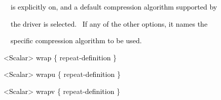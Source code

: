 \documentclass[a4paper]{article}
\newcommand\textstyleOOoComputerKeyWord[1]{\textrm{\textcolor[rgb]{0.0,0.0,0.5019608}{#1}}}
\newcommand\textstyleOOoAssemblerSpecialChar[1]{\textrm{\textcolor[rgb]{0.0,0.5019608,0.0}{#1}}}
\newcommand\textstyleOOoAssemblerIdent[1]{\textrm{\textcolor{black}{#1}}}
\newcommand\textstyleOOoAssemblerDirective[1]{\textrm{\textcolor[rgb]{0.0,0.5019608,1.0}{#1}}}
\begin{document}
{\color{black}
\textstyleOOoComputerKeyWord{\textcolor{black}{\ \ \ \ is explicitly on, and a default compression algorithm supported
by}}}

\clearpage
\bigskip

{\color{black}
\textstyleOOoComputerKeyWord{\textcolor{black}{\ \ \ \ the driver is selected. \ If any of the other options, it names
the}}}

{\color{black}
\textstyleOOoComputerKeyWord{\textcolor{black}{\ \ \ \ specific compression algorithm to be used.}}}


\bigskip

{\color{black}
\textstyleOOoComputerKeyWord{\textcolor{black}{\ \ }}\textstyleOOoAssemblerSpecialChar{{\textless}}\textstyleOOoAssemblerIdent{Scalar}\textstyleOOoAssemblerSpecialChar{{\textgreater}}\textstyleOOoComputerKeyWord{\textcolor{black}{
}}\textstyleOOoAssemblerIdent{wrap}\textstyleOOoComputerKeyWord{\textcolor{black}{
}}\textstyleOOoAssemblerSpecialChar{\{}\textstyleOOoComputerKeyWord{\textcolor{black}{
}}\textstyleOOoAssemblerDirective{repeat}\textstyleOOoAssemblerSpecialChar{{}-}\textstyleOOoAssemblerIdent{definition}\textstyleOOoComputerKeyWord{\textcolor{black}{
}}\textstyleOOoAssemblerSpecialChar{\}}}

{\color{black}
\textstyleOOoComputerKeyWord{\textcolor{black}{\ \ }}\textstyleOOoAssemblerSpecialChar{{\textless}}\textstyleOOoAssemblerIdent{Scalar}\textstyleOOoAssemblerSpecialChar{{\textgreater}}\textstyleOOoComputerKeyWord{\textcolor{black}{
}}\textstyleOOoAssemblerIdent{wrapu}\textstyleOOoComputerKeyWord{\textcolor{black}{
}}\textstyleOOoAssemblerSpecialChar{\{}\textstyleOOoComputerKeyWord{\textcolor{black}{
}}\textstyleOOoAssemblerDirective{repeat}\textstyleOOoAssemblerSpecialChar{{}-}\textstyleOOoAssemblerIdent{definition}\textstyleOOoComputerKeyWord{\textcolor{black}{
}}\textstyleOOoAssemblerSpecialChar{\}}}

{\color{black}
\textstyleOOoComputerKeyWord{\textcolor{black}{\ \ }}\textstyleOOoAssemblerSpecialChar{{\textless}}\textstyleOOoAssemblerIdent{Scalar}\textstyleOOoAssemblerSpecialChar{{\textgreater}}\textstyleOOoComputerKeyWord{\textcolor{black}{
}}\textstyleOOoAssemblerIdent{wrapv}\textstyleOOoComputerKeyWord{\textcolor{black}{
}}\textstyleOOoAssemblerSpecialChar{\{}\textstyleOOoComputerKeyWord{\textcolor{black}{
}}\textstyleOOoAssemblerDirective{repeat}\textstyleOOoAssemblerSpecialChar{{}-}\textstyleOOoAssemblerIdent{definition}\textstyleOOoComputerKeyWord{\textcolor{black}{
}}\textstyleOOoAssemblerSpecialChar{\}}}
\end{document}

